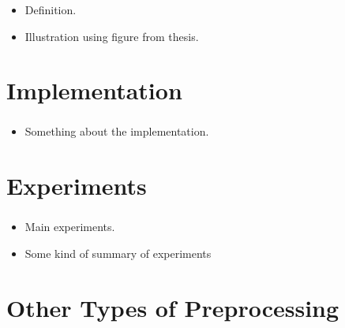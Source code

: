 \documentclass[english]{beamer}
\begin{document}
\begin{frame}
  \frametitle{\insertsection}
  \begin{itemize}
    \tiny
  \item Definition.
  \item Illustration using figure from thesis.
  \end{itemize}
\end{frame}

\section{Implementation}

\begin{frame}
  \frametitle{\insertsection}
  \begin{itemize}
    \tiny
  \item Something about the implementation.
  \end{itemize}
\end{frame}

\section{Experiments}

\begin{frame}
  \frametitle{\insertsection}
  \begin{itemize}
    \tiny
  \item Main experiments.
  \item Some kind of summary of experiments
  \end{itemize}
\end{frame}

\section{Other Types of Preprocessing}

\begin{frame}
  \frametitle{\insertsection}

\end{frame}
\end{document}
